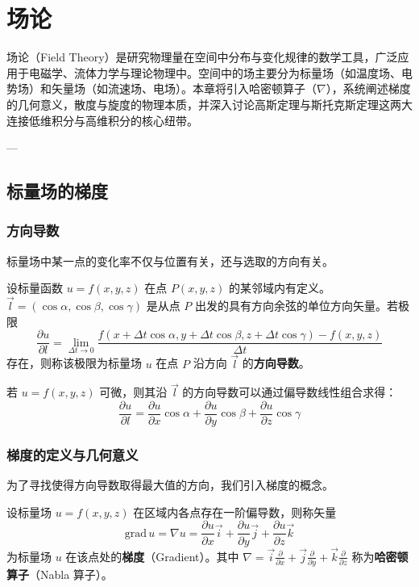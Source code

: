 \chapter{场论}

场论（Field Theory）是研究物理量在空间中分布与变化规律的数学工具，广泛应用于电磁学、流体力学与理论物理中。空间中的场主要分为标量场（如温度场、电势场）和矢量场（如流速场、电场）。本章将引入哈密顿算子（$\nabla$），系统阐述梯度的几何意义，散度与旋度的物理本质，并深入讨论高斯定理与斯托克斯定理这两大连接低维积分与高维积分的核心纽带。

---

\section{标量场的梯度}

\subsection{方向导数}
标量场中某一点的变化率不仅与位置有关，还与选取的方向有关。
\begin{tcolorbox}[colback=blue!5!white, colframe=blue!75!black, title=定义 \thechapter.1 \quad 方向导数]
	设标量函数 $u = f(x, y, z)$ 在点 $P(x, y, z)$ 的某邻域内有定义。$\vec{l} = (\cos\alpha, \cos\beta, \cos\gamma)$ 是从点 $P$ 出发的具有方向余弦的单位方向矢量。若极限
	$$ \frac{\partial u}{\partial l} = \lim_{\Delta t \to 0} \frac{f(x + \Delta t\cos\alpha, y + \Delta t\cos\beta, z + \Delta t\cos\gamma) - f(x, y, z)}{\Delta t} $$
	存在，则称该极限为标量场 $u$ 在点 $P$ 沿方向 $\vec{l}$ 的\textbf{方向导数}。
\end{tcolorbox}

若 $u = f(x, y, z)$ 可微，则其沿 $\vec{l}$ 的方向导数可以通过偏导数线性组合求得：
$$ \frac{\partial u}{\partial l} = \frac{\partial u}{\partial x}\cos\alpha + \frac{\partial u}{\partial y}\cos\beta + \frac{\partial u}{\partial z}\cos\gamma $$

\subsection{梯度的定义与几何意义}
为了寻找使得方向导数取得最大值的方向，我们引入梯度的概念。
\begin{tcolorbox}[colback=blue!5!white, colframe=blue!75!black, title=定义 \thechapter.2 \quad 梯度]
	设标量场 $u = f(x, y, z)$ 在区域内各点存在一阶偏导数，则称矢量
	$$ \text{grad}\,u = \nabla u = \frac{\partial u}{\partial x}\vec{i} + \frac{\partial u}{\partial y}\vec{j} + \frac{\partial u}{\partial z}\vec{k} $$
	为标量场 $u$ 在该点处的\textbf{梯度}（Gradient）。其中 $\nabla = \vec{i}\frac{\partial}{\partial x} + \vec{j}\frac{\partial}{\partial y} + \vec{k}\frac{\partial}{\partial z}$ 称为\textbf{哈密顿算子}（Nabla 算子）。
\end{tcolorbox}

